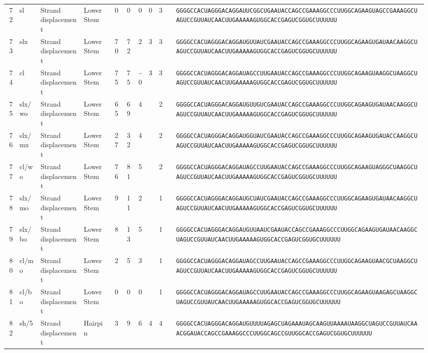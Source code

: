 \begin{tabular}{rlllrrrrrcl}
 72 &
 sl &
 Strand displacement &
 Lower Stem &
 0 &
 0 &
 0 &
 0 &
 3 &
  &
 \verb|GGGGCCACUAGGGACAGGAUUCGGCUGAAUACCAGCCGAAAGGCCCUUGGCAGAAGUAGCCGAAAGGCUAGUCCGUUAUCAACUUGAAAAAGUGGCACCGAGUCGGUGCUUUUUU| \\
 73 &
 slx &
 Strand displacement &
 Lower Stem &
 70 &
 72 &
 2 &
 3 &
 3 &
  &
 \verb|GGGGCCACUAGGGACAGGAUGUUAUCGAAUACCAGCCGAAAGGCCCUUGGCAGAAGUGAUAACAAGGCUAGUCCGUUAUCAACUUGAAAAAGUGGCACCGAGUCGGUGCUUUUUU| \\
 74 &
 cl &
 Strand displacement &
 Lower Stem &
 75 &
 75 &
 -0 &
 3 &
 3 &
  &
 \verb|GGGGCCACUAGGGACAGGAUAGCCUUGAAUACCAGCCGAAAGGCCCUUGGCAGAAGUAAGGCUAAGGCUAGUCCGUUAUCAACUUGAAAAAGUGGCACCGAGUCGGUGCUUUUUU| \\
 75 &
 slx/wo &
 Strand displacement &
 Lower Stem &
 65 &
 69 &
 4 &
  &
 2 &
  &
 \verb|GGGGCCACUAGGGACAGGAUGUUGUCGAAUACCAGCCGAAAGGCCCUUGGCAGAAGUGAUAACAAGGCUAGUCCGUUAUCAACUUGAAAAAGUGGCACCGAGUCGGUGCUUUUUU| \\
 76 &
 slx/mx &
 Strand displacement &
 Lower Stem &
 27 &
 32 &
 4 &
  &
 2 &
  &
 \verb|GGGGCCACUAGGGACAGGAUGGUAUCGAAUACCAGCCGAAAGGCCCUUGGCAGAAGUGAUACCAAGGCUAGUCCGUUAUCAACUUGAAAAAGUGGCACCGAGUCGGUGCUUUUUU| \\
 77 &
 cl/wo &
 Strand displacement &
 Lower Stem &
 76 &
 81 &
 5 &
  &
 2 &
  &
 \verb|GGGGCCACUAGGGACAGGAUAGCCUUGAAUACCAGCCGAAAGGCCCUUGGCAGAAGUAGGGCUAAGGCUAGUCCGUUAUCAACUUGAAAAAGUGGCACCGAGUCGGUGCUUUUUU| \\
 78 &
 slx/mo &
 Strand displacement &
 Lower Stem &
 9 &
 11 &
 2 &
  &
 1 &
  &
 \verb|GGGGCCACUAGGGACAGGAUGCUAUCGAAUACCAGCCGAAAGGCCCUUGGCAGAAGUGAUAACAAGGCUAGUCCGUUAUCAACUUGAAAAAGUGGCACCGAGUCGGUGCUUUUUU| \\
 79 &
 slx/bo &
 Strand displacement &
 Lower Stem &
 8 &
 13 &
 5 &
  &
 1 &
  &
 \verb|GGGGCCACUAGGGACAGGAUGUUAAUCGAAUACCAGCCGAAAGGCCCUUGGCAGAAGUGAUAACAAGGCUAGUCCGUUAUCAACUUGAAAAAGUGGCACCGAGUCGGUGCUUUUUU| \\
 80 &
 cl/mo &
 Strand displacement &
 Lower Stem &
 2 &
 5 &
 3 &
  &
 1 &
  &
 \verb|GGGGCCACUAGGGACAGGAUAGCCUUGAAUACCAGCCGAAAGGCCCUUGGCAGAAGUAACGCUAAGGCUAGUCCGUUAUCAACUUGAAAAAGUGGCACCGAGUCGGUGCUUUUUU| \\
 81 &
 cl/bo &
 Strand displacement &
 Lower Stem &
 0 &
 0 &
 0 &
  &
 1 &
  &
 \verb|GGGGCCACUAGGGACAGGAUAGCCUUGAAUACCAGCCGAAAGGCCCUUGGCAGAAGUAAGAGCUAAGGCUAGUCCGUUAUCAACUUGAAAAAGUGGCACCGAGUCGGUGCUUUUUU| \\
 82 &
 sh/5 &
 Strand displacement &
 Hairpin &
 3 &
 9 &
 6 &
 4 &
 4 &
  &
 \verb|GGGGCCACUAGGGACAGGAUGUUUUAGAGCUAGAAAUAGCAAGUUAAAAUAAGGCUAGUCCGUUAUCAAACGGAUACCAGCCGAAAGGCCCUUGGCAGCCGUUGGCACCGAGUCGGUGCUUUUUU| \\

\end{tabular}
